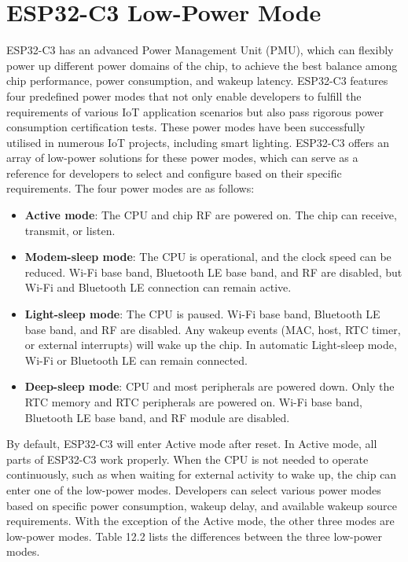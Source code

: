 \documentclass[a4paper,12pt,openany]{book}
\begin{document}
\section{ESP32-C3 Low-Power Mode}
ESP32-C3 has an advanced Power Management Unit (PMU), which can flexibly power up different power domains of the chip, to achieve the best balance among chip performance, power consumption, and wakeup latency. ESP32-C3 features four predefined power modes that not only enable developers to fulfill the requirements of various IoT application scenarios but also pass rigorous power consumption certification tests. These power modes have been successfully utilised in numerous IoT projects, including smart lighting. ESP32-C3 offers an array of low-power solutions for these power modes, which can serve as a reference for developers to select and configure based on their specific requirements. The four power modes are as follows:

\begin{itemize}
    \item \textbf{Active mode}: The CPU and chip RF are powered on. The chip can receive, transmit, or listen.
    \item \textbf{Modem-sleep mode}: The CPU is operational, and the clock speed can be reduced. Wi-Fi base band, Bluetooth LE base band, and RF are disabled, but Wi-Fi and Bluetooth LE connection can remain active.
    \item \textbf{Light-sleep mode}: The CPU is paused. Wi-Fi base band, Bluetooth LE base band, and RF are disabled. Any wakeup events (MAC, host, RTC timer, or external interrupts) will wake up the chip. In automatic Light-sleep mode, Wi-Fi or Bluetooth LE can remain connected.
    \item \textbf{Deep-sleep mode}: CPU and most peripherals are powered down. Only the RTC memory and RTC peripherals are powered on. Wi-Fi base band, Bluetooth LE base band, and RF module are disabled.
\end{itemize}

By default, ESP32-C3 will enter Active mode after reset. In Active mode, all parts of ESP32-C3 work properly. When the CPU is not needed to operate continuously, such as when waiting for external activity to wake up, the chip can enter one of the low-power modes. Developers can select various power modes based on specific power consumption, wakeup delay, and available wakeup source requirements. With the exception of the Active mode, the other three modes are low-power modes. Table 12.2 lists the differences between the three low-power modes.
\end{document}
